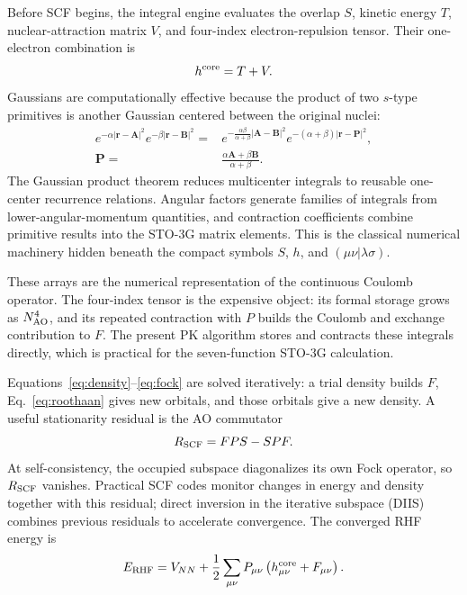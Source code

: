 \documentclass[10pt,twocolumn]{article}
\begin{document}
Before SCF begins, the integral engine evaluates the overlap $S$, kinetic
energy $T$, nuclear-attraction matrix $V$, and four-index electron-repulsion
tensor.  Their one-electron combination is
\begin{equation}
h^{\rm core}=T+V.
\label{eq:core-integrals}
\end{equation}
Gaussians are computationally effective because the product of two $s$-type
primitives is another Gaussian centered between the original nuclei:
\begin{align}
e^{-\alpha|\mathbf r-\mathbf A|^2}
e^{-\beta|\mathbf r-\mathbf B|^2}
={}&e^{-\frac{\alpha\beta}{\alpha+\beta}|\mathbf A-\mathbf B|^2}
e^{-(\alpha+\beta)|\mathbf r-\mathbf P|^2},\nonumber\\
\mathbf P={}&\frac{\alpha\mathbf A+\beta\mathbf B}{\alpha+\beta}.
\label{eq:gaussian-product}
\end{align}
The Gaussian product theorem reduces multicenter integrals to reusable
one-center recurrence relations.  Angular factors generate families of
integrals from lower-angular-momentum quantities, and contraction coefficients
combine primitive results into the STO-3G matrix elements.  This is the
classical numerical machinery hidden beneath the compact symbols $S$, $h$, and
$(\mu\nu|\lambda\sigma)$.

These arrays are the numerical representation of the continuous Coulomb
operator.  The four-index tensor is the expensive object: its formal storage
grows as $N_{\rm AO}^4$, and its repeated contraction with $P$ builds the
Coulomb and exchange contribution to $F$.  The present PK algorithm stores and
contracts these integrals directly, which is practical for the seven-function
STO-3G calculation.

Equations~\eqref{eq:density}--\eqref{eq:fock} are solved iteratively: a trial
density builds $F$, Eq.~\eqref{eq:roothaan} gives new orbitals, and those
orbitals give a new density.  A useful stationarity residual is the AO
commutator
\begin{equation}
R_{\rm SCF}=FPS-SPF.
\label{eq:scf-residual}
\end{equation}
At self-consistency, the occupied subspace diagonalizes its own Fock operator,
so $R_{\rm SCF}$ vanishes.  Practical SCF codes monitor changes in energy and
density together with this residual; direct inversion in the iterative
subspace (DIIS) combines previous residuals to accelerate convergence.  The
converged RHF energy is
\begin{equation}
E_{\rm RHF}=V_{NN}+\frac12\sum_{\mu\nu}P_{\mu\nu}
\left(h^{\rm core}_{\mu\nu}+F_{\mu\nu}\right).
\label{eq:rhf-energy}
\end{equation}
\end{document}
